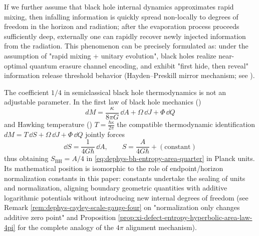 \begin{remark}\label{rem:dephys-horizon-scrambler-recovery-threshold}
If we further assume that black hole internal dynamics approximates rapid mixing, then infalling information is quickly spread non-locally to degrees of freedom in the horizon and radiation;
after the evaporation process proceeds sufficiently deep, externally one can rapidly recover newly injected information from the radiation.
This phenomenon can be precisely formulated as: under the assumption of "rapid mixing + unitary evolution", black holes realize near-optimal quantum erasure channel encoding,
and exhibit "first hide, then reveal" information release threshold behavior (Hayden--Preskill mirror mechanism; see \cite{HaydenPreskill2007BlackHolesMirrors}).
\end{remark}

\begin{proposition}\label{prop:dephys-one-quarter-normalization}
The coefficient \(1/4\) in semiclassical black hole thermodynamics is not an adjustable parameter.
In the first law of black hole mechanics (\cite{BardeenCarterHawking1973FourLaws})
\[
dM=\frac{\kappa}{8\pi G}\,\dd A+\Omega\,\dd J+\Phi\,\dd Q
\]
and Hawking temperature (\cite{Hawking1975ParticleCreation})
\(
T=\frac{\hbar\kappa}{2\pi}
\)
the compatible thermodynamic identification
\(
dM=T\,\dd S+\Omega\,\dd J+\Phi\,\dd Q
\)
jointly forces
\[
\boxed{\;
\dd S=\frac{1}{4G\hbar}\,\dd A,\qquad
S=\frac{A}{4G\hbar}+(\text{constant})\;}
\]
thus obtaining \(S_{\mathrm{BH}}=A/4\) in \eqref{eq:dephys-bh-entropy-area-quarter} in Planck units.
Its mathematical position is isomorphic to the role of endpoint/horizon normalization constants in this paper: constants undertake the sealing of units and normalization, aligning boundary geometric quantities with additive logarithmic potentials without introducing new internal degrees of freedom
(see Remark \ref{rem:dephys-cayley-scale-gauge-four} on "normalization only changes additive zero point" and Proposition \ref{prop:xi-defect-entropy-hyperbolic-area-law-4pi} for the complete analogy of the \(4\pi\) alignment mechanism).
\end{proposition}

